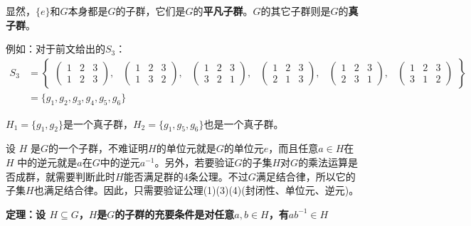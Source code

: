 \documentclass[12pt]{article}
\begin{document}
显然，$\{e\}$和$G$本身都是$G$的子群，它们是$G$的\textbf{平凡子群}。$G$的其它子群则是$G$的\textbf{真子群}。

\begin{framed}
\small {
例如：对于前文给出的$S_3$：
\begin{align*}
S_3 &= \begin{Bmatrix}
\begin{pmatrix}
1 & 2 & 3\\
1 & 2 & 3
\end{pmatrix}, &
\begin{pmatrix}
1 & 2 & 3\\
1 & 3 & 2
\end{pmatrix}, &
\begin{pmatrix}
1 & 2 & 3\\
3 & 2 & 1
\end{pmatrix}, &
\begin{pmatrix}
1 & 2 & 3\\
2 & 1 & 3
\end{pmatrix}, &
\begin{pmatrix}
1 & 2 & 3\\
2 & 3 & 1
\end{pmatrix}, &
\begin{pmatrix}
1 & 2 & 3\\
3 & 1 & 2
\end{pmatrix}
\end{Bmatrix}  \\
&= \{g_1, g_2, g_3, g_4, g_5, g_6\}
\end{align*}

$H_1 = \{g_1, g_2\}$是一个真子群，$H_2=\{g_1, g_5, g_6\}$也是一个真子群。
}
\end{framed}

设 $H$ 是$G$的一个子群，不难证明$H$的单位元就是$G$的单位元$e$，而且任意$a\in H$在 $H$ 中的逆元就是$a$在$G$中的逆元$a^{-1}$。另外，若要验证$G$的子集$H$对$G$的乘法运算是否成群，就需要判断此时$H$能否满足群的4条公理。不过$G$满足结合律，所以它的子集$H$也满足结合律。因此，只需要验证公理(1)(3)(4)(封闭性、单位元、逆元)。

\begin{mdframed}[
linecolor=black!40,outerlinewidth=1pt,roundcorner=.5em,innertopmargin=1ex,innerbottommargin=.5\baselineskip,innerrightmargin=1em,innerleftmargin=1em,backgroundcolor=gray!5,
]
\textbf{
定理：设 $H \subseteq G$，$H$是$G$的子群的充要条件是对任意$a, b \in H$，有$ab^{-1} \in H$
}
\end{mdframed}
\end{document}
